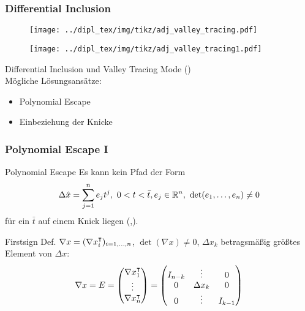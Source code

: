 \begin{frame}[<+->]
\frametitle{Differential Inclusion}
\centering
\begin{figure}
  \begin{minipage}{0.45\textwidth} 
	\texttt{[image: ../dipl\_tex/img/tikz/adj\_valley\_tracing.pdf]}
	\end{minipage}
	\hfill
	\begin{minipage}{0.45\textwidth}
	\texttt{[image: ../dipl\_tex/img/tikz/adj\_valley\_tracing1.pdf]}	
	\end{minipage}
	
\end{figure}
Differential Inclusion und Valley Tracing Mode (\cite{khan2014}) \\
\pause
Mögliche Lösungsansätze:\hfill
\begin{itemize}
 \item Polynomial Escape
 \item Einbeziehung der Knicke
\end{itemize}
\end{frame}
\begin{frame}[<+->]
\frametitle{Polynomial Escape I}
\vspace*{-0.1cm} 
\begin{block}{Polynomial Escape \cite[Prop. 6]{monster}}
 Es kann kein Pfad der Form
 \vspace*{-0.3cm}
 \[\Delta \hat x = \sum_{j=1}^n e_j t^j, ~ 0<t<\bar t, e_j\in \mathbb R^n,~ \det(e_1,\ldots,e_n) \neq 0\]
 \vspace*{0.3cm}
 für ein $\bar t$ auf einem Knick liegen (\cite[Proposition 6]{monster},\cite[S.11]{plan}).
\end{block}
\vspace*{-0.1cm} 
\begin{block}{Firstsign}
 Def. $\nabla x = (\nabla x_i^\intercal)_{i=1,\ldots,n}$, $\det(\nabla x)\neq 0$, $\Delta x_k$ betragsmäßig größtes Element von $\Delta x$: 
 \vspace*{-0.3cm}
 \[
 \nabla x = E =
\begin{pmatrix}
  \nabla x_1^\intercal\\
  \vdots\\
  \nabla x_n^\intercal\\
 \end{pmatrix}
 =
  \begin{pmatrix}
   I_{n-k} & \vdots &0\\
  0 & \Delta x_k & 0\\
    0 & \vdots&I_{k-1}
 \end{pmatrix}
\]

\end{block}

\end{frame}

